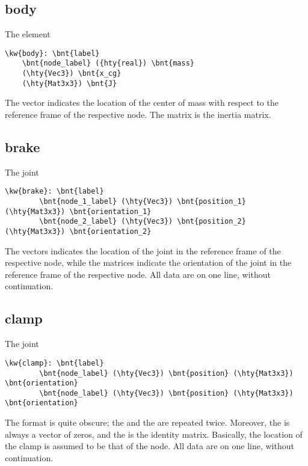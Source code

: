 \subsection{body}
The  element
\begin{Verbatim}[commmandchars=\\\{\}]
  \kw{body}: \bnt{label}
  	\bnt{node_label} ({hty{real}) \bnt{mass} 
	(\hty{Vec3}) \bnt{x_cg} 
  	(\hty{Mat3x3}) \bnt{J}
\end{Verbatim}
The  vector indicates the location of the center of mass with respect to
the reference frame of the respective node. The  matrix is the inertia
matrix.

\subsection{brake}
The  joint
\begin{Verbatim}[commandchars=\\\{\}]
    \kw{brake}: \bnt{label}
        \bnt{node_1_label} (\hty{Vec3}) \bnt{position_1} (\hty{Mat3x3}) \bnt{orientation_1}
        \bnt{node_2_label} (\hty{Vec3}) \bnt{position_2} (\hty{Mat3x3}) \bnt{orientation_2}
\end{Verbatim}
The  vectors indicates the location of the joint
in the reference frame of the respective node,
while the  matrices indicate the orientation of the joint
in the reference frame of the respective node.
All data are on one line, without continuation.

\subsection{clamp}
The  joint
\begin{Verbatim}[commandchars=\\\{\}]
    \kw{clamp}: \bnt{label}
        \bnt{node_label} (\hty{Vec3}) \bnt{position} (\hty{Mat3x3}) \bnt{orientation}
        \bnt{node_label} (\hty{Vec3}) \bnt{position} (\hty{Mat3x3}) \bnt{orientation}
\end{Verbatim}
The format is quite obscure; the  and the 
are repeated twice.
Moreover, the  is always a vector of zeros,
and the  is the identity matrix.
Basically, the location of the clamp is assumed to be that of the node.
All data are on one line, without continuation.

